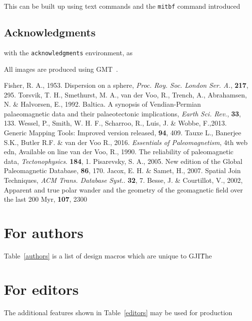 This can be built up using text commands and the \verb"mitbf" command introduced

\subsection{Acknowledgments}
with the \texttt{acknowledgments} environment, as

\begin{acknowledgments}
All images are produced using GMT~\cite{W13}.
\end{acknowledgments}

\begin{thebibliography}{}
    Fisher, R. A., 1953. Dispersion on a sphere,
    \textit{Proc. Roy. Soc. London Ser. A.}, \textbf{217}, 295.
	Torsvik, T. H., Smethurst, M. A., van der Voo, R., Trench, A., Abrahamsen,
	N. \& Halvorsen, E., 1992. Baltica. A synopsis of Vendian-Permian
	palaeomagnetic data and their palaeotectonic implications, \textit{Earth
	Sci. Rev.}, \textbf{33}, 133.
	Wessel, P., Smith, W. H. F., Scharroo, R., Luis, J. \& Wobbe, F.,2013.
	Generic Mapping Tools: Improved version released, \eos{}
	\textbf{94}, 409.
	Tauxe L., Banerjee S.K., Butler R.F. \& van der Voo R., 2016.
	\textit{Essentials of Paleomagnetism}, 4th web edn, Available on line
    van der Voo, R., 1990. The reliability of paleomagnetic data,
	\textit{Tectonophysics}. \textbf{184}, 1.
	Pisarevsky, S. A., 2005. New edition of the Global Paleomagnetic Database,
	\eos{}\textbf{86}, 170.
	Jacox, E. H. \& Samet, H., 2007. Spatial Join Techniques, \textit{ACM
	Trans. Database Syst.}. \textbf{32}, 7.
    Besse, J. \& Courtillot, V., 2002, Apparent and true polar
    wander and the geometry of the geomagnetic field over the last 200 Myr,
	\jgr{}\textbf{107}, 2300
\end{thebibliography}


\appendix
\section{For authors}

Table~\ref{authors} is a list of design macros which are unique to GJI\. The

\section{For editors}

The additional features shown in Table~\ref{editors} may be used for production

\bsp{} %
~\label{lastpage}
